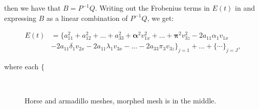 \documentclass[12pt]{article}
\begin{document}
then we have that $B = P^{-1}Q$.
Writing out the Frobenius terms in $E(t)$ in and expressing $B$ as a linear combination of $P^{-1}Q$, we get:

\begin{align*}
E(t) &= \lbrace a_{11}^2 + a_{12}^2 + \ldots + a_{33}^2 + \boldsymbol{\alpha}^2 v_{1x}^2 + \ldots + \boldsymbol{\pi}^2 v_{3z}^2 - 2 a_{11} \alpha_1 v_{1x} \\
& - 2 a_{11} \delta_1 v_{2x} - 2 a_{11} \lambda_1 v_{3x} - \ldots - 2 a_{33} \pi_3 v_{3z} \rbrace_{j = 1} + \ldots + \lbrace \cdots \rbrace_{j = J},
\end{align*}

where each $\lbrace $

\begin{figure}
\\
\caption{Horse and armadillo meshes, morphed mesh is in the middle.}
\label{fig:linearInterpolation}
\end{figure}
\end{document}

